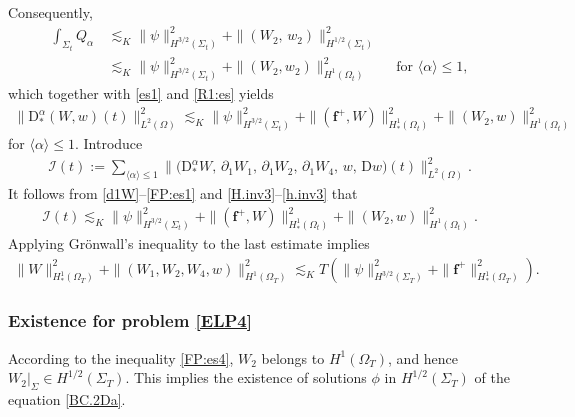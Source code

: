 \documentclass[twoside,11pt]{article}
\numberwithin{equation}{section}
\def\p{\partial}
\begin{document}
Consequently,
\begin{align} \nonumber
	\int_{\Sigma_t} {Q}_{\alpha}
	\,  & \lesssim_K  \|  {\psi} \|_{H^{3/2}(\Sigma_t)}^2 + \|(W_2, \, w_2) \|_{H^{1/2}(\Sigma_t)}^2  \\[0.5mm]
	& \lesssim_K  \|  {\psi} \|_{H^{3/2}(\Sigma_t)}^2
	+\| (W_2,w_2 )\|_{H^{1}(\Omega_{t})}^2
	\qquad \textrm{for }\langle \alpha\rangle \leq  1,
	\nonumber
\end{align}
which together with \eqref{es1} and \eqref{R1:es} yields
\begin{align}
	\|\mathrm{D}_*^{\alpha}(W,w)(t)\|_{L^2(\Omega)}^2
 \lesssim_K 	\|  {\psi} \|_{H^{3/2}(\Sigma_t)}^2+ {\|}(\bm{f}^+,W){\|}_{H_*^1(\Omega_{t})}^2
	+ \| (W_2, w)  \|_{H^{1}(\Omega_{t})}^2
	\label{FP:es1}	
\end{align}
for ${\langle\alpha\rangle\leq 1}$.
Introduce
\begin{align} \nonumber
	\mathcal{I}(t):= 	\sum_{\langle\alpha\rangle\leq 1}\big\|\big(\mathrm{D}_*^{\alpha}W,\, \p_1 W_1 , \,\p_1 W_2 , \, \p_1 W_4,\, w,\,\mathrm{D} w\big)(t)\big\|_{L^2(\Omega)}^2.
\end{align}
It follows from \eqref{d1W}--\eqref{FP:es1} and \eqref{H.inv3}--\eqref{h.inv3} that
\begin{align}
	\mathcal{I}(t) \lesssim_K 	\|  {\psi} \|_{H^{3/2}(\Sigma_t)}^2+ {\|}(\bm{f}^+,W){\|}_{H_*^1(\Omega_{t})}^2
	+ \| (W_2, w)  \|_{H^{1}(\Omega_{t})}^2.
	\nonumber %
\end{align}
Applying Gr\"{o}nwall's inequality to the last estimate implies
\begin{align}
	{\|} W{\|}_{H_*^1(\Omega_{T})}^2
	+\| (W_1, W_2, W_4,  w)   \|_{H^{1}(\Omega_{T})}^2
	\lesssim_K 	T   \left( \|  {\psi} \|_{H^{3/2}(\Sigma_T)}^2+ {\|} \bm{f}^+ {\|}_{H_*^1(\Omega_{T})}^2 \right).
	\label{FP:es4}	
\end{align}






\subsubsection{Existence for problem \eqref{ELP4}}
According to the inequality \eqref{FP:es4}, $W_2$ belongs to $H^{1}(\Omega_T)$,
and hence $W_2|_{\Sigma}\in H^{1/2}(\Sigma_T)$.
This implies the existence of solutions $\phi$ in $H^{1/2}(\Sigma_T)$ of the equation \eqref{BC.2Da}.
\end{document}
